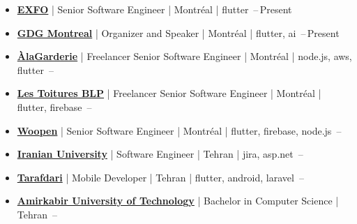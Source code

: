 \documentclass[letterpaper,11pt]{article}
\begin{document}


\begin{itemize}[leftmargin=*, noitemsep, topsep=0pt, partopsep=0pt]
      \item
            \href{https://exfo.com}
            {\textbf{EXFO}} | Senior Software Engineer | Montréal | flutter
            \hfill {}\,--\,Present

      \item    \BigGap
            \href{https://gdg.community.dev/gdg-montreal}
            {\textbf{GDG Montreal}} | Organizer and Speaker | Montréal | flutter, ai
            \hfill {}\,--\,Present

      \item    \BigGap
            \href{https://alagarderie.ca}
            {\textbf{ÀlaGarderie}} | Freelancer Senior Software Engineer | Montréal | node.js, aws, flutter
            \hfill {}\,--\,

      \item    \BigGap
            \href{https://toituresblp.ca}
            {\textbf{Les Toitures BLP}} | Freelancer Senior Software Engineer | Montréal | flutter, firebase
            \hfill {}\,--\,

      \item    \BigGap
            \href{https://woopen.com}
            {\textbf{Woopen}} | Senior Software Engineer | Montréal | flutter, firebase, node.js
            \hfill {}\,--\,

      \item   \BigGap
            \href{https://en.iranian.ac.ir}
            {\textbf{Iranian University}} | Software Engineer | Tehran | jira, asp.net
            \hfill {}\,--\,

      \item   \BigGap
            \href{https://tarafdari.com}
            {\textbf{Tarafdari}} | Mobile Developer | Tehran | flutter, android, laravel
            \hfill {}\,--\,

      \item   \BigGap
            \href{https://aut.ac.ir/en}
            {\textbf{Amirkabir University of Technology}} | Bachelor in Computer Science | Tehran
            \hfill {}\,--\,
\end{itemize}
\end{document}
